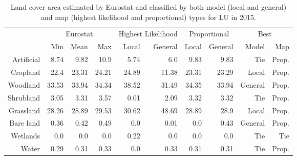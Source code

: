     \begin{table}[H]
    \centering
    \caption{Land cover area estimated by Eurostat and classified by both model (local and general) and map (highest likelihood and proportional) types for LU in 2015.}
    
    \begin{tabular}{r|rrr|rr|rr|rr}
    \toprule
    {} & \multicolumn{3}{|c}{Eurostat} & \multicolumn{2}{|c}{Highest Likelihood} & \multicolumn{2}{|c}{Proportional} & \multicolumn{2}{|c}{Best} \\
    {} &      Min &   Mean &    Max &              Local & General &        Local & General &    Model &    Map \\
    \midrule
    Artificial &     8.74 &   9.82 &   10.9 &               5.74 &     6.0 &         9.83 &    9.83 &      Tie &  Prop. \\
    Cropland   &     22.4 &  23.31 &  24.21 &              24.89 &   11.38 &        23.31 &   23.29 &    Local &  Prop. \\
    Woodland   &    33.53 &  33.94 &  34.34 &              38.52 &   31.49 &        34.35 &   33.94 &  General &  Prop. \\
    Shrubland  &     3.05 &   3.31 &   3.57 &               0.01 &    2.09 &         3.32 &    3.32 &      Tie &  Prop. \\
    Grassland  &    28.26 &  28.89 &  29.53 &              30.62 &   48.69 &        28.89 &    28.9 &    Local &  Prop. \\
    Bare land  &     0.36 &   0.42 &   0.49 &                0.0 &    0.01 &          0.0 &    0.43 &  General &  Prop. \\
    Wetlands   &      0.0 &    0.0 &    0.0 &               0.22 &     0.0 &          0.0 &     0.0 &      Tie &    Tie \\
    Water      &     0.29 &   0.31 &   0.33 &                0.0 &    0.33 &         0.31 &    0.31 &      Tie &  Prop. \\
    \bottomrule
    \end{tabular}
    \end{table}
    
